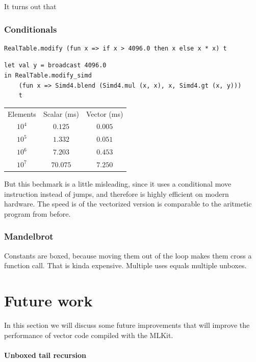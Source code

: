 \documentclass{article}
\begin{document}
It turns out that 
\subsubsection{Conditionals}

\begin{lstlisting}
RealTable.modify (fun x => if x > 4096.0 then x else x * x) t
\end{lstlisting}

\begin{lstlisting}
let val y = broadcast 4096.0
in RealTable.modify_simd
    (fun x => Simd4.blend (Simd4.mul (x, x), x, Simd4.gt (x, y)))
    t
\end{lstlisting}

\begin{center}
\begin{tabular}{ c c c }
    Elements & Scalar (ms) & Vector (ms) \\
    $10^4$ & $0.125$ & $0.005$ \\
    $10^5$ & $1.332$ & $0.051$ \\
    $10^6$ & $7.203$ & $0.453$ \\
    $10^7$ & $70.075$ & $7.250$
\end{tabular}
\end{center}

But this bechmark is a little misleading, since it uses a conditional move instruction instead of jumps, and therefore is highly efficient on modern hardware. The speed is of the vectorized version is comparable to the aritmetic program from before.

\subsubsection{Mandelbrot}

Constants are boxed, because moving them out of the loop makes them cross a function call. That is kinda expensive. Multiple uses equals multiple unboxes.


\section{Future work}

In this section we will discuss some future improvements that will improve the performance of vector code compiled with the MLKit.

\paragraph{Unboxed tail recursion}
\end{document}
